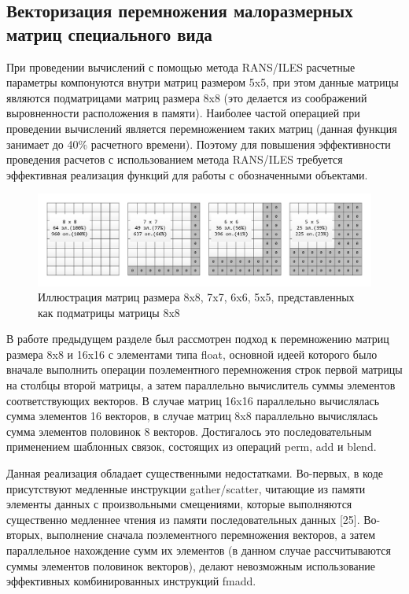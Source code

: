 \subsection{Векторизация перемножения малоразмерных матриц специального вида}

При проведении вычислений с помощью метода RANS/ILES расчетные параметры компонуются внутри матриц размером 5x5, при этом данные матрицы являются подматрицами матриц размера 8x8 (это делается из соображений выровненности расположения в памяти).
Наиболее частой операцией при проведении вычислений является перемножением таких матриц (данная функция занимает до 40\% расчетного времени).
Поэтому для повышения эффективности проведения расчетов с использованием метода RANS/ILES требуется эффективная реализация функций для работы с обозначенными объектами.

\begin{figure}[ht]
	\centering
		\includegraphics[width=1.00\textwidth]{./pics/text_4_spec_matr/matrices.pdf}
	\caption{Иллюстрация матриц размера 8x8, 7x7, 6x6, 5x5, представленных как подматрицы матрицы 8x8}
	\label{fig:text_4_spec_matr_matrices}
\end{figure}

В работе предыдущем разделе был рассмотрен подход к перемножению матриц размера 8x8 и 16x16 с элементами типа float, основной идеей которого было вначале выполнить операции поэлементного перемножения строк первой матрицы на столбцы второй матрицы, а затем параллельно вычислитель суммы элементов соответствующих векторов.
В случае матриц 16x16 параллельно вычислялась сумма элементов 16 векторов, в случае матриц 8x8 параллельно вычислялась сумма элементов половинок 8 векторов.
Достигалось это последовательным применением шаблонных связок, состоящих из операций perm, add и blend.

Данная реализация обладает существенными недостатками.
Во-первых, в коде присутствуют медленные инструкции gather/scatter, читающие из памяти элементы данных с произвольными смещениями, которые выполняются существенно медленнее чтения из памяти последовательных данных [25].
Во-вторых, выполнение сначала поэлементного перемножения векторов, а затем параллельное нахождение сумм их элементов (в данном случае рассчитываются суммы элементов половинок векторов), делают невозможным использование эффективных комбинированных инструкций fmadd.

